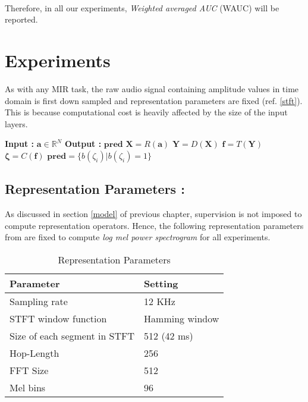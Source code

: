 \\
Therefore, in all our experiments, \textit{Weighted averaged AUC} (WAUC) will be reported.

\section{Experiments}
\label{experiments}
 
As with any MIR task, the raw audio signal containing amplitude values in time domain is first down sampled and representation parameters are fixed (ref. \ref{stft}). This is because computational cost is heavily affected by the size of the input layers.
\begin{algorithm}
  \caption{$\textbf{pred}$ = $Model$($\textbf{a}$) }\label{exp:abstraction}
  \begin{algorithmic}[1]
    \Statex \textbf{Input :} $\textbf{a} \in \mathbb{R}^{N}$
    \Statex \textbf{Output :} $\textbf{pred}$ 
    \State $\textbf{X} = R(\textbf{a})$ 
    \State $\textbf{Y} = D(\textbf{X})$ 
    \State $\textbf{f} = T(\textbf{Y})$ 
    \State $\bm{\zeta} = C(\textbf{f})$ 
    \State $\textbf{pred} = \{ b(\zeta_{i}) | b(\zeta_{i}) = 1 \}$ 
  \end{algorithmic}
\end{algorithm}
\FloatBarrier

\subsection{Representation Parameters :}
\label{repPara}
As discussed in section \ref{model} of previous chapter, supervision is not imposed to compute representation operators. Hence, the following  representation parameters from \cite{choi_cnn} are fixed to compute \textit{log mel power spectrogram} for all experiments. 

\begin{table}[H]
\label{tab:repPara}
\centering
\begin{tabular}{| p{} | p{}|}
\hline
\textbf{Parameter} & \textbf{Setting}\\
\hline
Sampling rate & 12 KHz\\
\hline
STFT window function & Hamming window\\
\hline
Size of each segment in STFT & 512 (42 ms)\\
\hline
Hop-Length & 256\\
\hline
FFT Size & 512\\
\hline
Mel bins & 96\\
\hline
\end{tabular}
\caption{Representation Parameters} 
\end{table}


